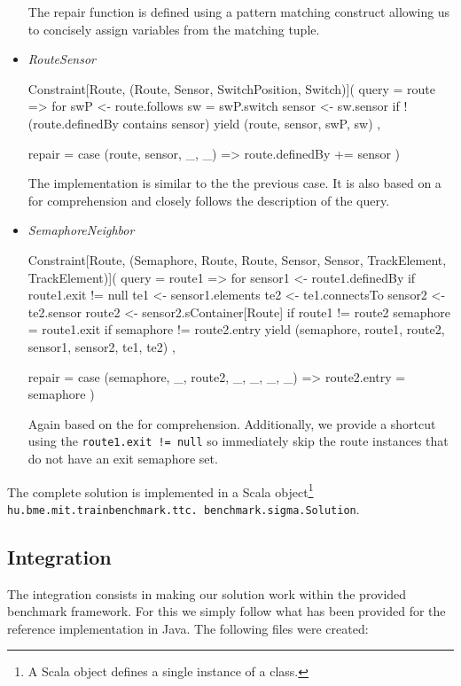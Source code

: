 \begin{itemize}[---]
  The repair function is defined using a pattern matching construct allowing us to concisely assign variables from the matching tuple.

  \item \emph{RouteSensor}
  \begin{scalacode}
  Constraint[Route, (Route, Sensor, SwitchPosition, Switch)](
    query = route => {
      for {
        swP <- route.follows
        sw = swP.switch
        sensor <- sw.sensor if !(route.definedBy contains sensor)
      } yield (route, sensor, swP, sw)
    },

    repair = {
      case (route, sensor, _, _) => route.definedBy += sensor
    }
  )
  \end{scalacode}
  The implementation is similar to the the previous case.
  It is also based on a for comprehension and closely follows the description of the query.

  \item \emph{SemaphoreNeighbor}
  \begin{scalacode}
  Constraint[Route, (Semaphore, Route, Route, Sensor, Sensor, TrackElement, TrackElement)](
    query = route1 => {
      for {
        sensor1 <- route1.definedBy if route1.exit != null
        te1 <- sensor1.elements
        te2 <- te1.connectsTo
        sensor2 <- te2.sensor
        route2 <- sensor2.sContainer[Route] if route1 != route2
        semaphore = route1.exit if semaphore != route2.entry
      } yield (semaphore, route1, route2, sensor1, sensor2, te1, te2)
    },

    repair = {
      case (semaphore, _, route2, _, _, _, _) => route2.entry = semaphore
    }
  )
  \end{scalacode}
  Again based on the for comprehension.
  Additionally, we provide a shortcut using the \texttt{route1.exit != null} so immediately skip the route instances that do not have an exit semaphore set. 

\end{itemize}

The complete solution is implemented in a Scala object\footnote{A Scala object defines a single instance of a class.} \texttt{hu.bme.mit.trainbenchmark.ttc. benchmark.sigma.Solution}.


\subsection{Integration}

The integration consists in making our solution work within the provided benchmark framework.
For this we simply follow what has been provided for the reference implementation in Java.
The following files were created:

